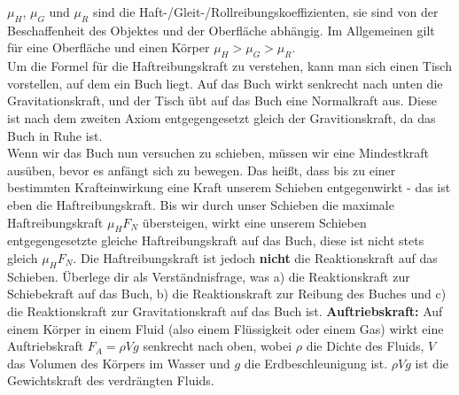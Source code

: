 \documentclass[11pt]{article}
\begin{document}
$\mu_H$, $\mu_G$ und $\mu_R$ sind die Haft-/Gleit-/Rollreibungskoeffizienten, sie sind von der Beschaffenheit des Objektes und der Oberfläche abhängig. Im Allgemeinen gilt für eine Oberfläche und einen Körper $\mu_H > \mu_G > \mu_R$. \\
Um die Formel für die Haftreibungskraft zu verstehen, kann man sich einen Tisch vorstellen, auf dem ein Buch liegt. Auf das Buch wirkt senkrecht nach unten die Gravitationskraft, und der Tisch übt auf das Buch eine Normalkraft aus. Diese ist nach dem zweiten Axiom entgegengesetzt gleich der Gravitionskraft, da das Buch in Ruhe ist. \\
Wenn wir das Buch nun versuchen zu schieben, müssen wir eine Mindestkraft ausüben, bevor es anfängt sich zu bewegen. Das heißt, dass bis zu einer bestimmten Krafteinwirkung eine Kraft unserem Schieben entgegenwirkt - das ist eben die Haftreibungskraft. Bis wir durch unser Schieben die maximale Haftreibungskraft $\mu_H F_N$ übersteigen, wirkt eine unserem Schieben entgegengesetzte gleiche Haftreibungskraft auf das Buch, diese ist nicht stets gleich $\mu_H F_N$. Die Haftreibungskraft ist jedoch \textbf{nicht} die Reaktionskraft auf das Schieben. Überlege dir als Verständnisfrage, was a) die Reaktionskraft zur Schiebekraft auf das Buch, b) die Reaktionskraft zur Reibung des Buches und c) die Reaktionskraft zur Gravitationskraft auf das Buch ist. 
\textbf{Auftriebskraft:} Auf einem Körper in einem Fluid (also einem Flüssigkeit oder einem Gas) wirkt eine Auftriebskraft $F_A = \rho Vg$ senkrecht nach oben, wobei $\rho$ die Dichte des Fluids, $V$ das Volumen des Körpers im Wasser und $g$ die Erdbeschleunigung ist. $\rho Vg$ ist die Gewichtskraft des verdrängten Fluids. 
\end{document}
